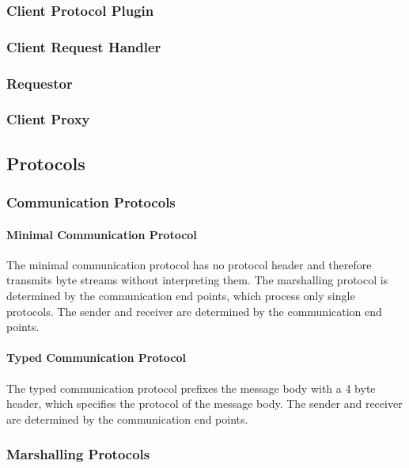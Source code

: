 \documentclass[a4paper]{article}
\begin{document}
\subsubsection{Client Protocol Plugin}

\subsubsection{Client Request Handler}

\subsubsection{Requestor}

\subsubsection{Client Proxy}

\subsection{Protocols}

\subsubsection{Communication Protocols}

\paragraph{Minimal Communication Protocol}

The minimal communication protocol has no protocol header and therefore transmits byte streams without interpreting them.
The marshalling protocol is determined by the communication end points, which process only single protocols.
The sender and receiver are determined by the communication end points.

\paragraph{Typed Communication Protocol}

The typed communication protocol prefixes the message body with a 4 byte header, which specifies the protocol of the message body.
The sender and receiver are determined by the communication end points.

\subsubsection{Marshalling Protocols}
\end{document}

